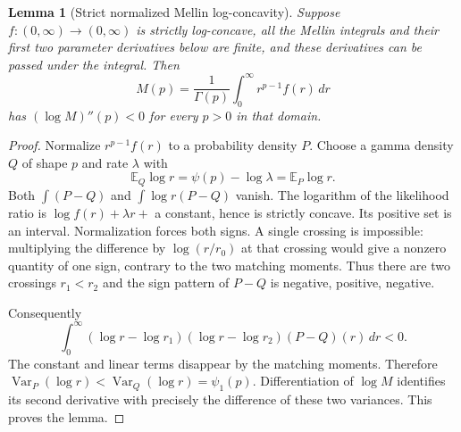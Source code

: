 \documentclass[11pt,a4paper]{article}
\numberwithin{equation}{section}
\newtheorem{lemma}[theorem]{Lemma}
\theoremstyle{definition}
\theoremstyle{remark}
\begin{document}
\begin{lemma}[Strict normalized Mellin log-concavity]\label{lem:mellin}
Suppose $f:(0,\infty)\to(0,\infty)$ is strictly log-concave, all the
Mellin integrals and their first two parameter derivatives below are
finite, and these derivatives can be passed under the integral. Then
\[
 M(p)=\frac1{\Gamma(p)}\int_0^\infty r^{p-1}f(r)\,dr
\]
has $(\log M)''(p)<0$ for every $p>0$ in that domain.
\end{lemma}
\begin{proof}
Normalize $r^{p-1}f(r)$ to a probability density $P$. Choose a gamma
density $Q$ of shape $p$ and rate $\lambda$ with
\[
 \mathbb E_Q\log r=\psi(p)-\log\lambda=\mathbb E_P\log r.
\]
Both $\int(P-Q)$ and $\int\log r(P-Q)$ vanish. The logarithm of the
likelihood ratio is $\log f(r)+\lambda r+$ a constant, hence is
strictly concave. Its positive set is an interval. Normalization
forces both signs. A single crossing is impossible: multiplying the
difference by $\log(r/r_0)$ at that crossing would give a nonzero
quantity of one sign, contrary to the two matching moments. Thus
there are two crossings $r_1<r_2$ and the sign pattern of $P-Q$ is
negative, positive, negative.

Consequently
\[
 \int_0^\infty
 (\log r-\log r_1)(\log r-\log r_2)(P-Q)(r)\,dr<0.
\]
The constant and linear terms disappear by the matching moments.
Therefore $\operatorname{Var}_P(\log r)<
\operatorname{Var}_Q(\log r)=\psi_1(p)$. Differentiation of $\log M$
identifies its second derivative with precisely the difference of
these two variances. This proves the lemma.
\end{proof}
\end{document}
